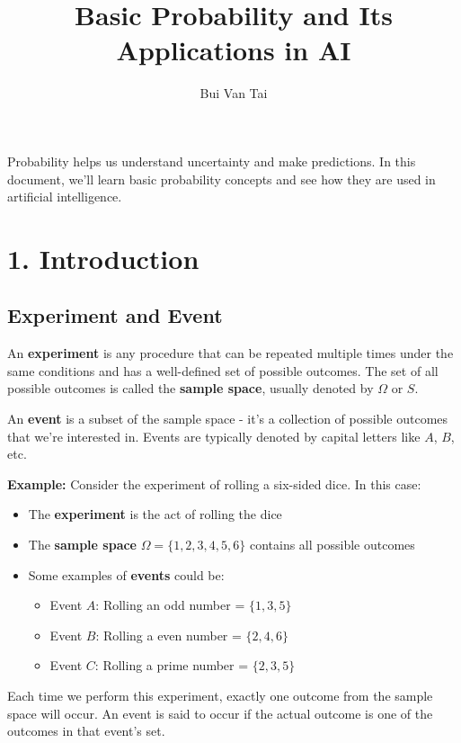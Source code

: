 \documentclass{article}
\title{Basic Probability and Its Applications in AI}
\author{Bui Van Tai}
\date{}
\begin{document}
\maketitle
Probability helps us understand uncertainty and make predictions.
In this document, we'll learn basic probability concepts and see how they are used in artificial intelligence.

\section*{1. Introduction}

\subsection*{Experiment and Event}

An \textbf{experiment} is any procedure that can be repeated multiple times under the same conditions and has a well-defined set of possible outcomes.
The set of all possible outcomes is called the \textbf{sample space}, usually denoted by $\Omega$ or $S$.

An \textbf{event} is a subset of the sample space - it's a collection of possible outcomes that we're interested in. Events are typically denoted by capital letters like $A$, $B$, etc.

\textbf{Example:}
Consider the experiment of rolling a six-sided dice. In this case:

\begin{itemize}
    \item The \textbf{experiment} is the act of rolling the dice
    \item The \textbf{sample space} $\Omega = \{1, 2, 3, 4, 5, 6\}$ contains all possible outcomes
    \item Some examples of \textbf{events} could be:
    \begin{itemize}
        \item Event $A$: Rolling an odd number = $\{1, 3, 5\}$
        \item Event $B$: Rolling a even number = $\{2, 4, 6\}$
        \item Event $C$: Rolling a prime number = $\{2, 3, 5\}$
    \end{itemize}
\end{itemize}

Each time we perform this experiment, exactly one outcome from the sample space will occur. An event is said to occur if the actual outcome is one of the outcomes in that event's set.
\end{document}
